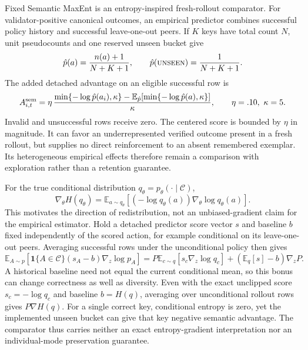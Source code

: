 \documentclass{article}
\newcommand{\1}{\mathbf 1}
\newcommand{\E}{\mathbb E}
\theoremstyle{remark}
\theoremstyle{definition}
\theoremstyle{plain}
\begin{document}
Fixed Semantic MaxEnt is an entropy-inspired fresh-rollout comparator.
For validator-positive canonical outcomes, an empirical predictor combines
successful policy history and successful leave-one-out peers. If $K$ keys
have total count $N$, unit pseudocounts and one reserved unseen bucket give
\begin{equation}
  \hat p(a)=\frac{n(a)+1}{N+K+1},\qquad
  \hat p(\textsc{unseen})=\frac{1}{N+K+1}.
  \label{eq:open-set-predictor}
\end{equation}
The added detached advantage on an eligible successful row is
\begin{equation}
  A^{\rm sem}_{i,t}=\eta\,
  \frac{\min\{-\log\hat p(a_i),\kappa\}
    -\E_{\hat p}[\min\{-\log\hat p(a),\kappa\}]}{\kappa},
  \qquad \eta=.10,\ \kappa=5.
  \label{eq:legacy-semantic-advantage}
\end{equation}
\label{app:legacy-semantic-estimator}
\label{app:semantic-estimator}
Invalid and unsuccessful rows receive zero. The centered score is bounded
by $\eta$ in magnitude. It can favor an underrepresented verified outcome
present in a fresh rollout, but supplies no direct reinforcement to an
absent remembered exemplar. Its heterogeneous empirical effects therefore
remain a comparison with exploration rather than a retention guarantee.

For the true conditional distribution $q_\theta=p_\theta(\cdot\mid\mathcal C)$,
\begin{equation}
 \nabla_\theta H(q_\theta)
 =\E_{a\sim q_\theta}[(-\log q_\theta(a))\nabla_\theta\log q_\theta(a)].
 \label{eq:entropy-score-function}
\end{equation}
This motivates the direction of redistribution, not an unbiased-gradient
claim for the empirical estimator. Hold a detached predictor score vector
$s$ and baseline $b$ fixed independently of the scored action, for example
conditional on its leave-one-out peers. Averaging successful rows under the
unconditional policy then gives
\[
 \E_{A\sim p}[\1\{A\in\mathcal C\}(s_A-b)\nabla_z\log p_A]
 =P\E_{c\sim q}[s_c\nabla_z\log q_c]
   +(\E_q[s]-b)\nabla_zP.
\]
A historical baseline need not equal the current conditional mean, so this
bonus can change correctness as well as diversity. Even with the exact
unclipped score $s_c=-\log q_c$ and baseline $b=H(q)$, averaging over
unconditional rollout rows gives $P\nabla H(q)$.
For a single correct key, conditional entropy is zero, yet the implemented
unseen bucket can give that key negative semantic advantage. The comparator
thus carries neither an exact entropy-gradient interpretation nor an
individual-mode preservation guarantee.
\end{document}
